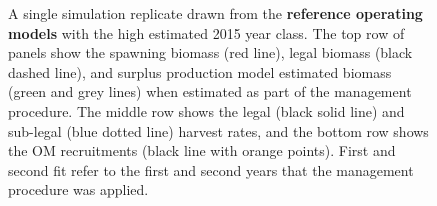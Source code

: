 \documentclass[11pt]{book}
\begin{document}
\newpage
\begin{landscape}
\begin{figure}[htb]

{\centering {} 

}

\caption{A single simulation replicate drawn from the \textbf{reference operating models} with the high estimated 2015 year class. The top row of panels show the spawning biomass (red line), legal biomass (black dashed line), and surplus production model estimated biomass (green and grey lines) when estimated as part of the management procedure. The middle row shows the legal (black solid line) and sub-legal (blue dotted line) harvest rates, and the bottom row shows the OM recruitments (black line with orange points). First and second fit refer to the first and second years that the management procedure was applied.}\label{fig:unnamed-chunk-20}
\end{figure}
\newpage
\begin{figure}[htb]

{\centering {} 

}
\end{figure}
\end{landscape}
\end{document}

